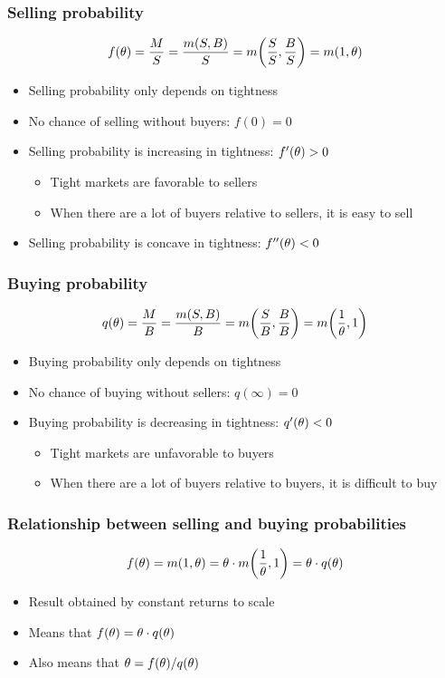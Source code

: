\documentclass[11pt,aspectratio=169,xcolor={dvipsnames},hyperref={pdftex,pdfpagemode=UseNone,hidelinks,pdfdisplaydoctitle=true},usepdftitle=false]{beamer}
\begin{document}
\begin{frame}
\frametitle{Selling probability}
\begin{equation*}
f(\theta) = \frac{M}{S} = \frac{m(S,B)}{S} = m{\left( \frac{S}{S},\frac{B}{S} \right)} = m(1,\theta)
\end{equation*}
\begin{itemize}
\item Selling probability only depends on tightness
\item No chance of selling without buyers: $f(0) =0$
\item Selling probability is increasing in tightness: $f'(\theta)>0$
\begin{itemize}
	\item Tight markets are favorable to sellers
	\item When there are a lot of buyers relative to sellers, it is easy to sell
\end{itemize}
\item Selling probability is concave in tightness: $f''(\theta)<0$
\end{itemize}	
\end{frame}

\begin{frame}
\frametitle{Buying probability}
\begin{equation*}
q(\theta) = \frac{M}{B} = \frac{m(S,B)}{B} = m{\left( \frac{S}{B},\frac{B}{B} \right)} = m{\left( \frac{1}{\theta},1 \right)}
\end{equation*}
\begin{itemize}
\item Buying probability only depends on tightness
\item No chance of buying without sellers: $q(\infty) = 0$
\item Buying probability is decreasing in tightness: $q'(\theta)<0$
\begin{itemize}
	\item Tight markets are unfavorable to buyers
	\item When there are a lot of buyers relative to buyers, it is difficult to buy
\end{itemize}
\end{itemize}	
\end{frame}

\begin{frame}
\frametitle{Relationship between selling and buying probabilities}
\begin{equation*}
f(\theta) = m(1,\theta) = \theta \cdot m{\left( \frac{1}{\theta},1 \right)} = \theta \cdot q(\theta)
\end{equation*}
\begin{itemize}
\item Result obtained by constant returns to scale
\item Means that $f(\theta) = \theta \cdot q(\theta)$
\item Also means that $\theta = f(\theta)/q(\theta)$ 
\end{itemize}	
\end{frame}
\end{document}
